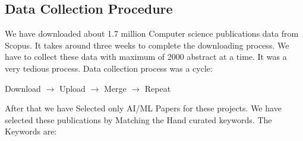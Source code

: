 \documentclass[conference]{IEEEtran}
\begin{document}
\subsection{Data Collection Procedure} \label{datashake}
We have downloaded about 1.7 million Computer science publications data from Scopus.  It takes around three weeks to complete the downloading process. We have to collect these data with maximum of 2000 abstract at a time. It was a very tedious process. Data collection process was a cycle:
\begin{center}
Download $\rightarrow$ Upload $\rightarrow$ Merge $\rightarrow$ Repeat
\end{center}
\par
After that we have Selected only AI/ML Papers for these projects. We have selected these publications by Matching the Hand curated keywords. The Keywords are:
\par
\end{document}
